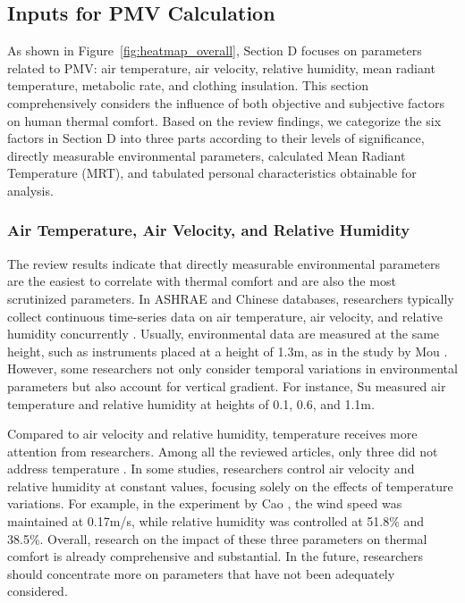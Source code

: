 \documentclass[final,3p,times,12pt]{elsarticle}
\begin{document}
\subsection{Inputs for PMV Calculation}
\label{subsec1}

As shown in Figure~\ref{fig:heatmap_overall}, Section D focuses on parameters related to PMV: air temperature, air velocity, relative humidity, mean radiant temperature, metabolic rate, and clothing insulation. This section comprehensively considers the influence of both objective and subjective factors on human thermal comfort. Based on the review findings, we categorize the six factors in Section D into three parts according to their levels of significance, directly measurable environmental parameters, calculated Mean Radiant Temperature (MRT), and tabulated personal characteristics obtainable for analysis.

\subsubsection{Air Temperature, Air Velocity, and Relative Humidity}

The review results indicate that directly measurable environmental parameters are the easiest to correlate with thermal comfort and are also the most scrutinized parameters. In ASHRAE and Chinese databases, researchers typically collect continuous time-series data on air temperature, air velocity, and relative humidity concurrently \cite{andamonThermalComfortBuilding2006,honnekeriUSEADAPTIVEACTIONS2014}. Usually, environmental data are measured at the same height, such as instruments placed at a height of 1.3m, as in the study by Mou \cite{mouFieldStudyThermal2022}. However, some researchers not only consider temporal variations in environmental parameters but also account for vertical gradient. For instance, Su \cite{suFieldStudyCold2021} measured air temperature and relative humidity at heights of 0.1, 0.6, and 1.1m.

Compared to air velocity and relative humidity, temperature receives more attention from researchers. Among all the reviewed articles, only three did not address temperature \cite{romeroEnergyOccupantsThermal2013,pigmanImpactCoolingStrategy}. In some studies, researchers control air velocity and relative humidity at constant values, focusing solely on the effects of temperature variations. For example, in the experiment by Cao \cite{caoFieldStudyHuman2011}, the wind speed was maintained at 0.17m/s, while relative humidity was controlled at 51.8\% and 38.5\%. Overall, research on the impact of these three parameters on thermal comfort is already comprehensive and substantial. In the future, researchers should concentrate more on parameters that have not been adequately considered.
\end{document}
